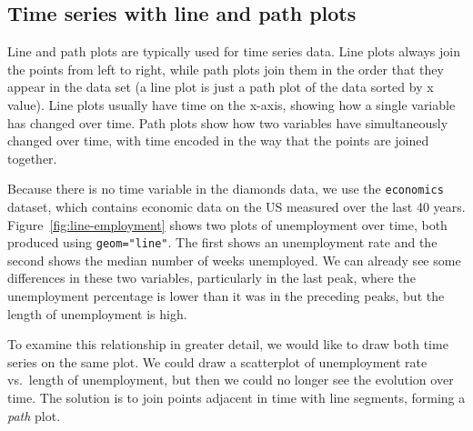 % 


\subsection{Time series with line and path plots}
\label{sub:line}

Line and path plots are typically used for time series data.  Line plots always join the points from left to right, while path plots join them in the order that they appear in the data set (a line plot is just a path plot of the data sorted by x value).  Line plots usually have time on the x-axis, showing how a single variable has changed over time.  Path plots show how two variables have simultaneously changed over time, with time encoded in the way that the points are joined together.

Because there is no time variable in the diamonds data, we use the {\tt economics} dataset, which contains economic data on the US measured over the last 40 years.  Figure~\ref{fig:line-employment} shows two plots of unemployment over time, both produced using {\tt geom="line"}.  The first shows an unemployment rate and the second shows the median number of weeks unemployed.  We can already see some differences in these two variables, particularly in the last peak, where the unemployment percentage is lower than it was in the preceding peaks, but the length of unemployment is high.

% 


To examine this relationship in greater detail, we would like to draw both time series on the same plot.  We could draw a scatterplot of unemployment rate vs.\ length of unemployment, but then we could no longer see the evolution over time.  The solution is to join points adjacent in time with line segments, forming a \emph{path} plot.

